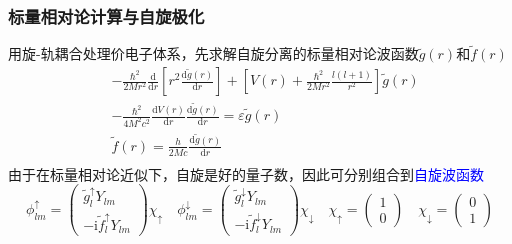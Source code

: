 {\frame
{
	\frametitle{标量相对论计算与自旋极化}
	用旋-轨耦合处理价电子体系，先求解自旋分离的标量相对论波函数$\tilde{g}(r)$和$\tilde{f}(r)$
	\begin{displaymath}
		\begin{aligned}
			&-\frac{\hbar^2}{2Mr^2}\frac{\mathrm{d}}{\mathrm{d}r}\left[ r^2\frac{\mathrm{d}\tilde{g}(r)}{\mathrm{d}r} \right]+\left[ V(r)+\frac{\hbar^2}{2Mr^2}\frac{l(l+1)}{r^2} \right]\tilde{g}(r)\\
			&-\frac{\hbar^2}{4M^2c^2}\frac{\mathrm{d}V(r)}{\mathrm{d}r}\frac{\mathrm{d}\tilde{g}(r)}{\mathrm{d}r}=\varepsilon\tilde{g}(r)\\
			&\tilde{f}(r)=\frac{h}{2Mc}\frac{\mathrm{d}\tilde{g}(r)}{\mathrm{d}r}\\
		\end{aligned}
	\end{displaymath}
	由于在标量相对论近似下，自旋是好的量子数，因此可分别组合到\textcolor{blue}{自旋波函数}
	\begin{displaymath}
		\phi_{lm}^{\uparrow}=\left( 
		\begin{matrix}
			\tilde{g}_l^{\uparrow}Y_{lm}\\
			-\mathrm{i}\tilde{f}_l^{\uparrow}Y_{lm}
		\end{matrix}
		\right)\chi_{\uparrow}\quad
		\phi_{lm}^{\downarrow}=\left( 
		\begin{matrix}
			\tilde{g}_l^{\downarrow}Y_{lm}\\
			-\mathrm{i}\tilde{f}_l^{\downarrow}Y_{lm}
		\end{matrix}
		\right)\chi_{\downarrow}\quad
		\chi_{\uparrow}=\left( 
		\begin{matrix}
			1\\
			0
		\end{matrix}
		\right)\quad
		\chi_{\downarrow}=\left( 
		\begin{matrix}
			0\\
			1
		\end{matrix}
		\right)
	\end{displaymath}
}

}
